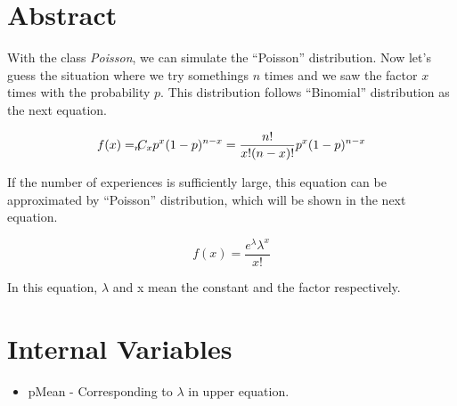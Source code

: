 %

\section{Abstract}

\noindent
With the class {\em Poisson}, we can simulate the ``Poisson''
distribution. Now let's guess the situation where we try somethings
$n$ times and we saw the factor $x$ times with the probability
$p$. This distribution follows ``Binomial'' distribution as the next
equation. 

\begin{equation}
f(x) = _n \hspace{-2mm} C_x p^x (1-p)^{n-x} = \frac{n!}{x! (n-x)!} p^x (1-p)^{n-x}
\end{equation} 

\noindent
If the number of experiences is sufficiently large, this equation can
be approximated by ``Poisson'' distribution, which will be shown in
the next equation.

\begin{equation}
f(x) = \frac{e^\lambda \lambda^x}{x!}
\end{equation}

\noindent
In this equation, $\lambda$ and x mean the constant and the factor respectively.

\vspace*{10mm}

\section{Internal Variables}

\begin{itemize}
\item pMean - Corresponding to $\lambda$ in upper equation.
\end{itemize}


\clearpage

